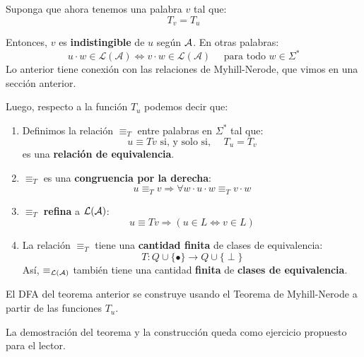 \begin{multicols}{2}
Suponga que ahora tenemos una palabra $v$ tal que:
$$
    T_v = T_u
$$

Entonces, $v$ es \textbf{indistingible} de $u$ según $\mathcal{A}$. En otras palabras:
$$
    u \cdot w \in \mathcal{L}(\mathcal{A}) \Leftrightarrow v \cdot w \in \mathcal{L}(\mathcal{A}) \quad \text { para todo } w \in \Sigma^*
$$
Lo anterior tiene conexión con las relaciones de Myhill-Nerode, que vimos en una sección anterior.
\end{multicols}
Luego, respecto a la función $T_u$ podemos decir que:
\begin{enumerate}
    \item Definimos la relación $\equiv_T$ entre palabras en $\Sigma^*$ tal que:
    $$
    u \equiv T v \text { si, y solo si, } \quad T_u=T_v
    $$
    es una \textbf{relación de equivalencia}.
    \item $\equiv_T$ es una \textbf{congruencia por la derecha}:
    $$
    u \equiv_T v \Rightarrow \forall w \cdot u \cdot w \equiv_T v \cdot w
    $$
    \item $\equiv_T$ \textbf{refina} a $\mathcal{L}(\mathcal{A})$:
    $$
    u \equiv T v \Rightarrow(u \in L \Leftrightarrow v \in L)
    $$
    \item La relación $\equiv_T$ tiene una \textbf{cantidad finita} de clases de equivalencia:
    $$
    T: Q \cup\{\bullet\} \rightarrow Q \cup\{\perp\}
    $$
    Así, $\equiv_{\mathcal{L}(\mathcal{A})}$ también tiene una cantidad \textbf{finita} de \textbf{clases de equivalencia}.
\end{enumerate}


El DFA del teorema anterior se construye usando el Teorema de Myhill-Nerode a partir de las funciones $T_u$. \medbreak

La demostración del teorema y la construcción queda como ejercicio propuesto para el lector.